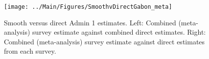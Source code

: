 \documentclass[12pt]{article}\usepackage[]{graphicx}\usepackage[]{color}
\newenvironment{knitrout}{}{} %
\begin{document}



\begin{knitrout}
\color{fgcolor}\begin{figure}[bht]

{\centering \texttt{[image: ../Main/Figures/SmoothvDirectGabon\_meta]} 

}

\caption[Smooth versus direct Admin 1 estimates]{Smooth versus direct Admin 1 estimates. Left: Combined (meta-analysis) survey estimate against combined direct estimates. Right: Combined (meta-analysis) survey estimate against direct estimates from each survey.}\label{fig:unnamed-chunk-123}
\end{figure}


\end{knitrout}
\end{document}
